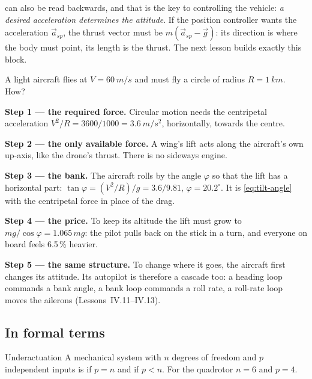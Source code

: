  can also be read backwards, and that is the key to controlling the vehicle: \emph{a desired acceleration determines the attitude}. If the position controller wants the acceleration $\vec a_{sp}$, the thrust vector must be $m(\vec a_{sp} - \vec g)$: its direction is where the body must point, its length is the thrust. The next lesson builds exactly this block.

\begin{example}
\label{ex:tilt-aircraft}
A light aircraft flies at $V = \SI{60}{m/s}$ and must fly a circle of radius $R = \SI{1}{km}$. How?

\textbf{Step 1 — the required force.} Circular motion needs the centripetal acceleration $V^2/R = 3600/1000 = \SI{3.6}{m/s^2}$, horizontally, towards the centre.

\textbf{Step 2 — the only available force.} A wing's lift acts along the aircraft's own up-axis, like the drone's thrust. There is no sideways engine.

\textbf{Step 3 — the bank.} The aircraft rolls by the angle $\varphi$ so that the lift has a horizontal part: $\tan\varphi = (V^2/R)/g = 3.6/9.81$, $\varphi = 20.2^\circ$. It is \cref{eq:tilt-angle} with the centripetal force in place of the drag.

\textbf{Step 4 — the price.} To keep its altitude the lift must grow to $mg/\cos\varphi = 1.065\,mg$: the pilot pulls back on the stick in a turn, and everyone on board feels 6.5\,\% heavier.

\textbf{Step 5 — the same structure.} To change where it goes, the aircraft first changes its attitude. Its autopilot is therefore a cascade too: a heading loop commands a bank angle, a bank loop commands a roll rate, a roll-rate loop moves the ailerons (Lessons~IV.11–IV.13).
\end{example}

\subsection{In formal terms}

\begin{definition}{Underactuation}
A mechanical system with $n$ degrees of freedom and $p$ independent inputs is  if $p = n$ and  if $p < n$. For the quadrotor $n = 6$ and $p = 4$.
\end{definition}

